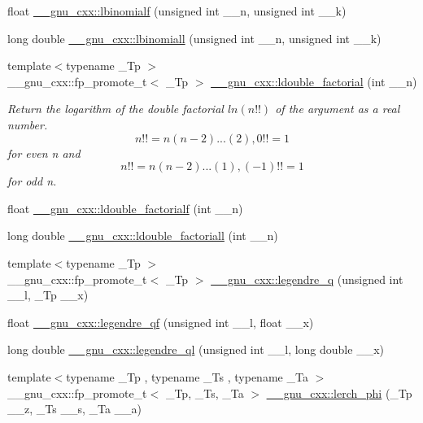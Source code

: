 \begin{DoxyCompactItemize}
float \hyperlink{group__mathsf__gnu_ga2fe55bab4211fb240e1eb01341914129}{\+\_\+\+\_\+gnu\+\_\+cxx\+::lbinomialf} (unsigned int \+\_\+\+\_\+n, unsigned int \+\_\+\+\_\+k)
\item 
long double \hyperlink{group__mathsf__gnu_ga20e6c250e10e20b9e2c3f68bf9a3d4c1}{\+\_\+\+\_\+gnu\+\_\+cxx\+::lbinomiall} (unsigned int \+\_\+\+\_\+n, unsigned int \+\_\+\+\_\+k)
\item 
{\footnotesize template$<$typename \+\_\+\+Tp $>$ }\\\+\_\+\+\_\+gnu\+\_\+cxx\+::fp\+\_\+promote\+\_\+t$<$ \+\_\+\+Tp $>$ \hyperlink{group__mathsf__gnu_ga43bf9a20282d5b9237bf352682a48395}{\+\_\+\+\_\+gnu\+\_\+cxx\+::ldouble\+\_\+factorial} (int \+\_\+\+\_\+n)
\begin{DoxyCompactList}\small\item\em Return the logarithm of the double factorial $ ln(n!!) $ of the argument as a real number. \[ n!! = n(n-2)...(2), 0!! = 1 \] for even {\ttfamily n} and \[ n!! = n(n-2)...(1), (-1)!! = 1 \] for odd {\ttfamily n}. \end{DoxyCompactList}\item 
float \hyperlink{group__mathsf__gnu_ga33ecc59a7ff139b483cebf42ecd4fe79}{\+\_\+\+\_\+gnu\+\_\+cxx\+::ldouble\+\_\+factorialf} (int \+\_\+\+\_\+n)
\item 
long double \hyperlink{group__mathsf__gnu_gae8fa4b4866cfd20349c985b33ed2936e}{\+\_\+\+\_\+gnu\+\_\+cxx\+::ldouble\+\_\+factoriall} (int \+\_\+\+\_\+n)
\item 
{\footnotesize template$<$typename \+\_\+\+Tp $>$ }\\\+\_\+\+\_\+gnu\+\_\+cxx\+::fp\+\_\+promote\+\_\+t$<$ \+\_\+\+Tp $>$ \hyperlink{group__mathsf__gnu_gadad5b22d0075dca31690907668af568f}{\+\_\+\+\_\+gnu\+\_\+cxx\+::legendre\+\_\+q} (unsigned int \+\_\+\+\_\+l, \+\_\+\+Tp \+\_\+\+\_\+x)
\item 
float \hyperlink{group__mathsf__gnu_ga46cf4d58886af402c6776bc090b4e4a7}{\+\_\+\+\_\+gnu\+\_\+cxx\+::legendre\+\_\+qf} (unsigned int \+\_\+\+\_\+l, float \+\_\+\+\_\+x)
\item 
long double \hyperlink{group__mathsf__gnu_ga60feac5a8bd733abee6610adf15208f2}{\+\_\+\+\_\+gnu\+\_\+cxx\+::legendre\+\_\+ql} (unsigned int \+\_\+\+\_\+l, long double \+\_\+\+\_\+x)
\item 
{\footnotesize template$<$typename \+\_\+\+Tp , typename \+\_\+\+Ts , typename \+\_\+\+Ta $>$ }\\\+\_\+\+\_\+gnu\+\_\+cxx\+::fp\+\_\+promote\+\_\+t$<$ \+\_\+\+Tp, \+\_\+\+Ts, \+\_\+\+Ta $>$ \hyperlink{group__mathsf__gnu_ga31d7cfc601a99d72e58f654d0c890fd6}{\+\_\+\+\_\+gnu\+\_\+cxx\+::lerch\+\_\+phi} (\+\_\+\+Tp \+\_\+\+\_\+z, \+\_\+\+Ts \+\_\+\+\_\+s, \+\_\+\+Ta \+\_\+\+\_\+a)

\end{DoxyCompactItemize}
